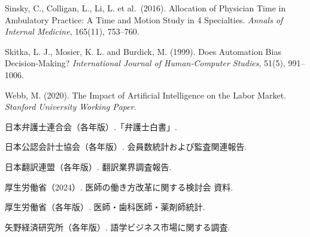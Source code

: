 \documentclass[11pt]{article}
\theoremstyle{plain}
\theoremstyle{definition}
\theoremstyle{remark}
\begin{document}
\begin{list}{}{\setlength{\leftmargin}{1.4em}\setlength{\itemindent}{-1.4em}\setlength{\itemsep}{2pt}}
\item Sinsky, C., Colligan, L., Li, L. et al.\ (2016). Allocation of Physician Time in Ambulatory Practice: A Time and Motion Study in 4 Specialties. \textit{Annals of Internal Medicine}, 165(11), 753--760.
\item Skitka, L. J., Mosier, K. L. and Burdick, M. (1999). Does Automation Bias Decision-Making? \textit{International Journal of Human-Computer Studies}, 51(5), 991--1006.
\item Webb, M. (2020). The Impact of Artificial Intelligence on the Labor Market. \textit{Stanford University Working Paper}.
\item 日本弁護士連合会（各年版）.「弁護士白書」.
\item 日本公認会計士協会（各年版）. 会員数統計および監査関連報告.
\item 日本翻訳連盟（各年版）. 翻訳業界調査報告.
\item 厚生労働省（2024）. 医師の働き方改革に関する検討会 資料.
\item 厚生労働省（各年版）. 医師・歯科医師・薬剤師統計.
\item 矢野経済研究所（各年版）. 語学ビジネス市場に関する調査.
\end{list}
\normalsize
\end{document}
